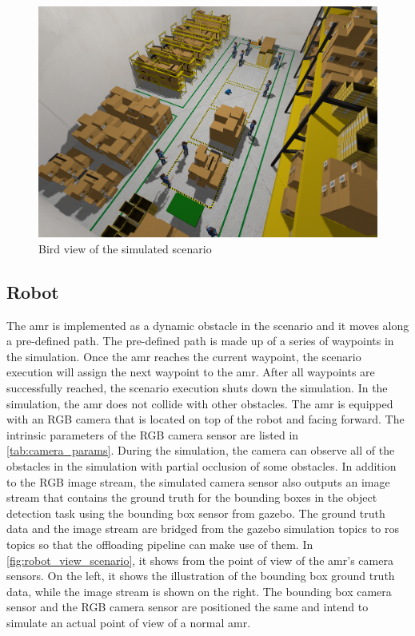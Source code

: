 \begin{figure}
    \centering
    \includegraphics[width=\linewidth]{figures/sim/bird_view.png}
    \caption{Bird view of the simulated scenario}
    \label{fig:bird_view_scenario}
\end{figure}

\subsection{Robot}

The \gls{amr} is implemented as a dynamic obstacle in the scenario and it moves along a pre-defined path. The pre-defined path is made up of a series of waypoints in the simulation. Once the \gls{amr} reaches the current waypoint, the scenario execution will assign the next waypoint to the \gls{amr}. After all waypoints are successfully reached, the scenario execution shuts down the simulation. In the simulation, the \gls{amr} does not collide with other obstacles. The \gls{amr} is equipped with an RGB camera that is located on top of the robot and facing forward. The intrinsic parameters of the RGB camera sensor are listed in \cref{tab:camera_params}. During the simulation, the camera can observe all of the obstacles in the simulation with partial occlusion of some obstacles. In addition to the RGB image stream, the simulated camera sensor also outputs an image stream that contains the ground truth for the bounding boxes in the object detection task using the bounding box sensor from \gls{gazebo}. The ground truth data and the image stream are bridged from the \gls{gazebo} simulation topics to \gls{ros} topics so that the offloading pipeline can make use of them. In \cref{fig:robot_view_scenario}, it shows from the point of view of the \gls{amr}'s camera sensors. On the left, it shows the illustration of the bounding box ground truth data, while the image stream is shown on the right. The bounding box camera sensor and the RGB camera sensor are positioned the same and intend to simulate an actual point of view of a normal \gls{amr}.

